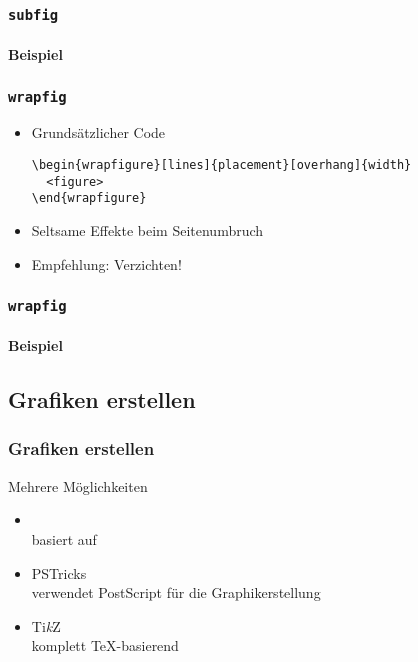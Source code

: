 \begin{frame}
  \frametitle{\texttt{subfig}}
  \framesubtitle{Beispiel}
\end{frame}

\begin{frame}[fragile]
  \frametitle{\texttt{wrapfig}}
  \begin{itemize}
  \item Grundsätzlicher Code
\begin{lstlisting}[language={[LaTeX]TeX}]
\begin{wrapfigure}[lines]{placement}[overhang]{width}
  <figure>
\end{wrapfigure}
\end{lstlisting}
  \item Seltsame Effekte beim Seitenumbruch
  \item Empfehlung: Verzichten!
  \end{itemize}
\end{frame}

\begin{frame}
  \frametitle{\texttt{wrapfig}}
  \framesubtitle{Beispiel}
\end{frame}

\subsection{Grafiken erstellen}
\begin{frame}
  \frametitle{Grafiken erstellen}
  Mehrere Möglichkeiten
  \begin{itemize}
  \item {}\\
    basiert auf 
  \item PSTricks\\
    verwendet PostScript für die Graphikerstellung
  \item Ti\emph{k}Z\\
    komplett \TeX-basierend
  \end{itemize}
\end{frame}

